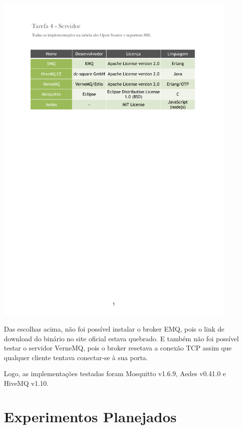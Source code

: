 \documentclass[12pt,a4paper]{article}
\begin{document}
\begin{center}
\includegraphics[width=0.9\textwidth]{brokers}
\end{center}

Das escolhas acima, não foi possível instalar o broker EMQ, pois o link de download do binário no site oficial estava quebrado. E também não foi possível testar o servidor VerneMQ, pois o broker resetava a conexão TCP assim que qualquer cliente tentava conectar-se à sua porta.

Logo, as implementações testadas foram Mosquitto v1.6.9, Aedes v0.41.0 e HiveMQ v1.10.

\section{Experimentos Planejados}
\end{document}
